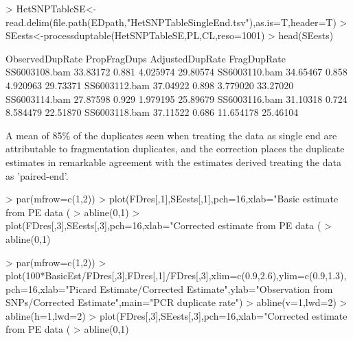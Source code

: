 \documentclass{article}
\begin{document}
\begin{Schunk}
\begin{Sinput}
> HetSNPTableSE<-read.delim(file.path(EDpath,"HetSNPTableSingleEnd.tsv"),as.is=T,header=T)
> SEests<-processduptable(HetSNPTableSE,PL,CL,reso=1001)
> head(SEests)
\end{Sinput}
\begin{Soutput}
              ObservedDupRate PropFragDups AdjustedDupRate FragDupRate
SS6003108.bam        33.83172        0.881        4.025974    29.80574
SS6003110.bam        34.65467        0.858        4.920963    29.73371
SS6003112.bam        37.04922        0.898        3.779020    33.27020
SS6003114.bam        27.87598        0.929        1.979195    25.89679
SS6003116.bam        31.10318        0.724        8.584479    22.51870
SS6003118.bam        37.11522        0.686       11.654178    25.46104
\end{Soutput}
\end{Schunk}



A mean of 85\% of the duplicates seen when treating the data as single end are attributable to fragmentation duplicates, and the correction places the duplicate estimates in remarkable agreement with the estimates derived treating the data as 'paired-end'. 

\begin{Schunk}
\begin{Sinput}
> par(mfrow=c(1,2))
> plot(FDres[,1],SEests[,1],pch=16,xlab="Basic estimate from PE data (%
> abline(0,1)
> plot(FDres[,3],SEests[,3],pch=16,xlab="Corrected estimate from PE data (%
> abline(0,1)
\end{Sinput}
\end{Schunk}

\begin{Schunk}
\begin{Sinput}
> par(mfrow=c(1,2))
> plot(100*BasicEst/FDres[,3],FDres[,1]/FDres[,3],xlim=c(0.9,2.6),ylim=c(0.9,1.3),pch=16,xlab="Picard Estimate/Corrected Estimate",ylab="Observation from SNPs/Corrected Estimate",main="PCR duplicate rate")
> abline(v=1,lwd=2)
> abline(h=1,lwd=2)
> plot(FDres[,3],SEests[,3],pch=16,xlab="Corrected estimate from PE data (%
> abline(0,1)
\end{Sinput}
\end{Schunk}
\end{document}
